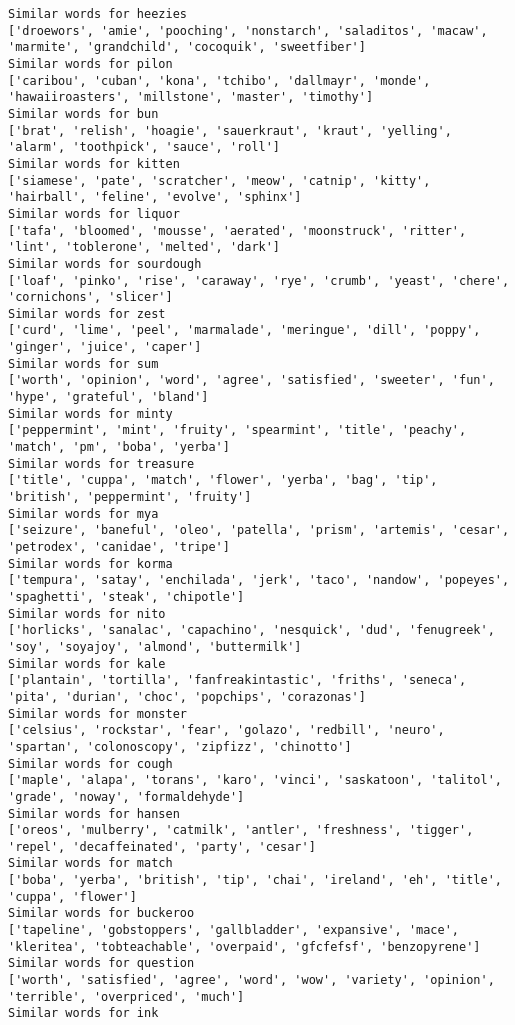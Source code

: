 \documentclass[11pt]{article}
\begin{document}
\begin{Verbatim}[commandchars=\\\{\}]
Similar words for heezies
['droewors', 'amie', 'pooching', 'nonstarch', 'saladitos', 'macaw', 'marmite', 'grandchild', 'cocoquik', 'sweetfiber']
Similar words for pilon
['caribou', 'cuban', 'kona', 'tchibo', 'dallmayr', 'monde', 'hawaiiroasters', 'millstone', 'master', 'timothy']
Similar words for bun
['brat', 'relish', 'hoagie', 'sauerkraut', 'kraut', 'yelling', 'alarm', 'toothpick', 'sauce', 'roll']
Similar words for kitten
['siamese', 'pate', 'scratcher', 'meow', 'catnip', 'kitty', 'hairball', 'feline', 'evolve', 'sphinx']
Similar words for liquor
['tafa', 'bloomed', 'mousse', 'aerated', 'moonstruck', 'ritter', 'lint', 'toblerone', 'melted', 'dark']
Similar words for sourdough
['loaf', 'pinko', 'rise', 'caraway', 'rye', 'crumb', 'yeast', 'chere', 'cornichons', 'slicer']
Similar words for zest
['curd', 'lime', 'peel', 'marmalade', 'meringue', 'dill', 'poppy', 'ginger', 'juice', 'caper']
Similar words for sum
['worth', 'opinion', 'word', 'agree', 'satisfied', 'sweeter', 'fun', 'hype', 'grateful', 'bland']
Similar words for minty
['peppermint', 'mint', 'fruity', 'spearmint', 'title', 'peachy', 'match', 'pm', 'boba', 'yerba']
Similar words for treasure
['title', 'cuppa', 'match', 'flower', 'yerba', 'bag', 'tip', 'british', 'peppermint', 'fruity']
Similar words for mya
['seizure', 'baneful', 'oleo', 'patella', 'prism', 'artemis', 'cesar', 'petrodex', 'canidae', 'tripe']
Similar words for korma
['tempura', 'satay', 'enchilada', 'jerk', 'taco', 'nandow', 'popeyes', 'spaghetti', 'steak', 'chipotle']
Similar words for nito
['horlicks', 'sanalac', 'capachino', 'nesquick', 'dud', 'fenugreek', 'soy', 'soyajoy', 'almond', 'buttermilk']
Similar words for kale
['plantain', 'tortilla', 'fanfreakintastic', 'friths', 'seneca', 'pita', 'durian', 'choc', 'popchips', 'corazonas']
Similar words for monster
['celsius', 'rockstar', 'fear', 'golazo', 'redbill', 'neuro', 'spartan', 'colonoscopy', 'zipfizz', 'chinotto']
Similar words for cough
['maple', 'alapa', 'torans', 'karo', 'vinci', 'saskatoon', 'talitol', 'grade', 'noway', 'formaldehyde']
Similar words for hansen
['oreos', 'mulberry', 'catmilk', 'antler', 'freshness', 'tigger', 'repel', 'decaffeinated', 'party', 'cesar']
Similar words for match
['boba', 'yerba', 'british', 'tip', 'chai', 'ireland', 'eh', 'title', 'cuppa', 'flower']
Similar words for buckeroo
['tapeline', 'gobstoppers', 'gallbladder', 'expansive', 'mace', 'kleritea', 'tobteachable', 'overpaid', 'gfcfefsf', 'benzopyrene']
Similar words for question
['worth', 'satisfied', 'agree', 'word', 'wow', 'variety', 'opinion', 'terrible', 'overpriced', 'much']
Similar words for ink

\end{Verbatim}
\end{document}
